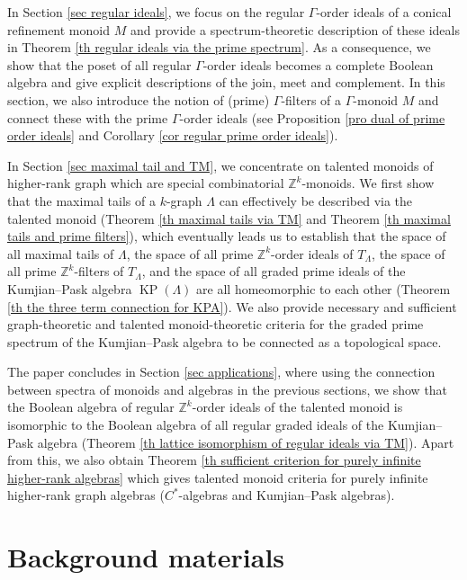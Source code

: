 \documentclass[a4paper,reqno,12pt]{amsart}
\numberwithin{equation}{section}
\theoremstyle{definition}
\theoremstyle{remark}
\newcommand{\KP}{\operatorname{KP}}
\begin{document}
In Section \ref{sec regular ideals}, we focus on the regular $\Gamma$-order ideals of a conical refinement monoid $M$ and provide a spectrum-theoretic description of these ideals in Theorem \ref{th regular ideals via the prime spectrum}. As a consequence, we show that the poset of all regular $\Gamma$-order ideals becomes a complete Boolean algebra and give explicit descriptions of the join, meet and complement. In this section, we also introduce the notion of (prime) $\Gamma$-filters of a $\Gamma$-monoid $M$ and connect these with the prime $\Gamma$-order ideals (see Proposition \ref{pro dual of prime order ideals} and Corollary \ref{cor regular prime order ideals}). 

In Section \ref{sec maximal tail and TM}, we concentrate on talented monoids of higher-rank graph which are special combinatorial $\mathbb{Z}^k$-monoids. We first show that the maximal tails of a $k$-graph $\Lambda$ can effectively be described via the talented monoid (Theorem \ref{th maximal tails via TM} and Theorem \ref{th maximal tails and prime filters}), which eventually leads us to establish that the space of all maximal tails of $\Lambda$, the space of all prime $\mathbb{Z}^k$-order ideals of $T_\Lambda$, the space of all prime $\mathbb{Z}^k$-filters of $T_\Lambda$, and the space of all graded prime ideals of the Kumjian--Pask algebra $\KP(\Lambda)$ are all homeomorphic to each other (Theorem \ref{th the three term connection for KPA}). We also provide necessary and sufficient graph-theoretic and talented monoid-theoretic criteria for the graded prime spectrum of the Kumjian--Pask algebra to be connected as a topological space.

The paper concludes in Section \ref{sec applications}, where using the connection between spectra of monoids and algebras in the previous sections, we show that the Boolean algebra of regular $\mathbb{Z}^k$-order ideals of the talented monoid is isomorphic to the Boolean algebra of all regular graded ideals of the Kumjian--Pask algebra (Theorem \ref{th lattice isomorphism of regular ideals via TM}). Apart from this, we also obtain Theorem \ref{th sufficient criterion for purely infinite higher-rank algebras} which gives talented monoid criteria for purely infinite higher-rank graph algebras ($C^*$-algebras and Kumjian--Pask algebras).  


\section{Background materials}\label{sec prelim}
\end{document}

